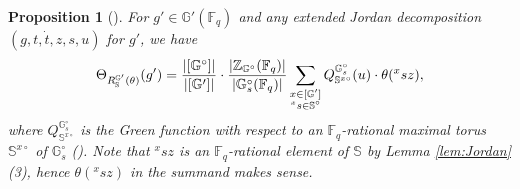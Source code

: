 \documentclass{amsart}
\newcommand{\F}{\mathbb{F}}
\newcommand{\bbS}{\mathbb{S}}
\newcommand{\bbG}{\mathbb{G}}
\newcommand{\bbZ}{\mathbb{Z}}
\theoremstyle{plain}
\newtheorem{prop}[thm]{Proposition}
\theoremstyle{definition}
\theoremstyle{remark}
\theoremstyle{theorem}
\begin{document}
\begin{prop}[{\cite[Proposition 3.4.24]{Kal19}}]\label{prop:Kaletha-CF}
    For $g'\in\bbG'(\F_{q})$ and any extended Jordan decomposition $(g,t,\dot{t},z,s,u)$ for $g'$, we have
\[
\Theta_{R_{\bbS}^{\bbG'}(\theta)}(g')
=\frac{|[\bbG^{\circ}]|}{|[\bbG']|}
\cdot\frac{|\bbZ_{\bbG^{\circ}}(\F_{q})|}{|\bbG^{\circ}_{s}(\F_{q})|}
\sum_{\begin{subarray}{c}x\in [\bbG'] \\ {}^{x}s\in\bbS^{\circ}\end{subarray}}
Q^{\bbG^{\circ}_{s}}_{\bbS^{x\circ}}(u)\cdot \theta({}^{x}sz),
\]
where $Q^{\bbG^{\circ}_{s}}_{\bbS^{x\circ}}$ is the Green function with respect to an $\F_{q}$-rational maximal torus $\bbS^{x\circ}$ of $\bbG^{\circ}_{s}$ (\cite[Definition 4.1]{DL76}).
Note that ${}^{x}sz$ is an $\F_{q}$-rational element of $\bbS$ by Lemma \ref{lem:Jordan} (3), hence $\theta({}^{x}sz)$ in the summand makes sense.
\end{prop}
\end{document}

